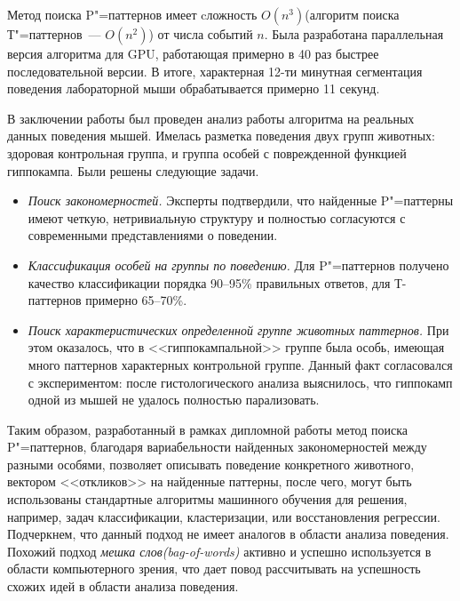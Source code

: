 Метод поиска P"=паттернов имеет 
cложность $O\left(n^3\right)$(алгоритм поиска Т"=паттернов~--- $O\left(n^2\right)$) от числа событий $n$.
Была разработана параллельная 
версия алгоритма для GPU, работающая примерно
в 40 раз быстрее последовательной версии.
В итоге, характерная 12-ти минутная сегментация поведения лабораторной мыши
обрабатывается примерно 11 секунд.

В заключении работы был проведен анализ работы алгоритма на 
реальных данных поведения мышей. 
Имелась разметка поведения двух групп животных: здоровая контрольная группа, 
и группа особей с поврежденной функцией гиппокампа. 
Были решены следующие задачи.
\begin{itemize}
    \item 
      \emph{Поиск закономерностей.} Эксперты подтвердили, что 
      найденные P"=паттерны имеют четкую, нетривиальную структуру и 
      полностью согласуются с современными представлениями о поведении.
    \item
      \emph{Классификация особей на группы по поведению.}
      Для P"=паттернов получено качество классификации порядка 90--95\% правильных ответов, 
      для Т-паттернов примерно 65--70\%.
    \item
      \emph{Поиск характеристических определенной группе животных паттернов.} При этом оказалось,
      что в <<гиппокампальной>> группе была особь, имеющая много паттернов характерных контрольной группе. 
      Данный факт согласовался с экспериментом: после гистологического
      анализа выяснилось, что гиппокамп одной из мышей не удалось полностью парализовать.
\end{itemize}

Таким образом, разработанный в рамках дипломной работы 
метод поиска P"=паттернов, благодаря вариабельности
найденных закономерностей между разными особями, позволяет описывать 
поведение конкретного животного, вектором <<откликов>> на найденные паттерны,
после чего, могут быть использованы стандартные алгоритмы машинного обучения 
для решения, например, задач классификации, кластеризации, или восстановления регрессии. 
Подчеркнем, что данный подход не имеет аналогов в области анализа поведения. 
Похожий подход \emph{мешка слов(bag-of-words)} активно и успешно 
используется в области компьютерного зрения, что дает повод рассчитывать на успешность
схожих идей в области анализа поведения.

